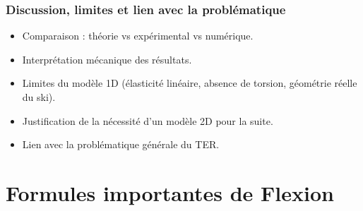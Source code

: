 \documentclass[12pt, a4paper]{article}
\begin{document}
\subsubsection{Discussion, limites et lien avec la problématique}
\begin{itemize}
    \item Comparaison : théorie vs expérimental vs numérique.
    \item Interprétation mécanique des résultats.
    \item Limites du modèle 1D (élasticité linéaire, absence de torsion, géométrie réelle du ski).
    \item Justification de la nécessité d'un modèle 2D pour la suite.
    \item Lien avec la problématique générale du TER.
\end{itemize}

\section{\textbf{Formules importantes de Flexion}}
\end{document}
